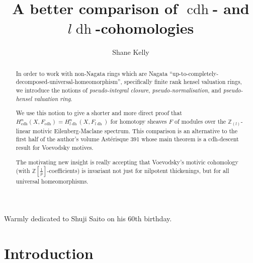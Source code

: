 \documentclass[10pt]{amsart}
\theoremstyle{definition}
\newcommand{\zpi}{\mathbb{Z}[\tfrac{1}{p}]}
\newcommand{\zll}{\mathbb{Z}_{(l)}}
\newcommand{\cdh}{{{\operatorname{cdh}}}}
\newcommand{\ldh}{{l{\operatorname{dh}}}}
\begin{document}
\title{A better comparison of $\cdh$- and $\ldh$-cohomologies}
\author{Shane Kelly}


\begin{abstract}
In order to work with non-Nagata rings which are Nagata ``up-to-completely-decomposed-universal-homeomorphism'', specifically finite rank hensel valuation rings, we introduce the notions of \emph{pseudo-integral closure}, \emph{pseudo-normalisation}, and \emph{pseudo-hensel valuation ring}.

We use this notion to give a shorter and more direct proof that $H_\cdh^n(X, F_\cdh) = H_\ldh^n(X, F_\ldh)$ for homotopy sheaves $F$ of modules over the $\zll$-linear motivic Eilenberg-Maclane spectrum. This comparison is an alternative to the first half of the author's volume Astérisque 391 whose main theorem is a cdh-descent result for Voevodsky motives. 

The motivating new insight is really accepting that Voevodsky's motivic cohomology (with $\zpi$-coefficients) is invariant not just for nilpotent thickenings, but for all universal homeomorphisms.
\end{abstract}


\maketitle

\begin{center}
Warmly dedicated to Shuji Saito on his 60th birthday.
\end{center}



\section{Introduction}
\end{document}
